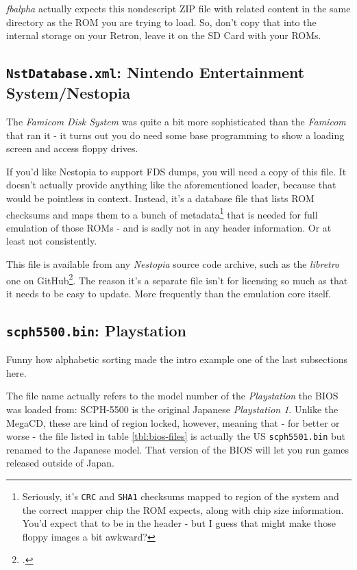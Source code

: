 \documentclass[english]{retronlabo-manual}
\begin{document}
\emph{fbalpha} actually expects this nondescript ZIP file with related content in the same directory as the ROM you are trying to load. So, don't copy that into the internal storage on your Retron, leave it on the SD Card with your ROMs.

\subsection{\texttt{NstDatabase.xml}: Nintendo Entertainment System/Nestopia}

The \emph{Famicom Disk System} was quite a bit more sophisticated than the \emph{Famicom} that ran it - it turns out you do need some base programming to show a loading screen and access floppy drives.

If you'd like Nestopia to support FDS dumps, you will need a copy of this file. It doesn't actually provide anything like the aforementioned loader, because that would be pointless in context. Instead, it's a database file that lists ROM checksums and maps them to a bunch of metadata\footnote{Seriously, it's \texttt{CRC} and \texttt{SHA1} checksums mapped to region of the system and the correct mapper chip the ROM expects, along with chip size information. You'd expect that to be in the header - but I guess that might make those floppy images a bit awkward?} that is needed for full emulation of those ROMs - and is sadly not in any header information. Or at least not consistently.

This file is available from any \emph{Nestopia} source code archive, such as the \emph{libretro} one on GitHub\footcite{ref:libretro-nestopia}. The reason it's a separate file isn't for licensing so much as that it needs to be easy to update. More frequently than the emulation core itself.

\subsection{\texttt{scph5500.bin}: Playstation}

Funny how alphabetic sorting made the intro example one of the last subsections here.

The file name actually refers to the model number of the \emph{Playstation} the BIOS was loaded from: SCPH-5500 is the original Japanese \emph{Playstation 1}. Unlike the MegaCD, these are kind of region locked, however, meaning that - for better or worse - the file listed in table \ref{tbl:bios-files} is actually the US \texttt{scph5501.bin} but renamed to the Japanese model. That version of the BIOS will let you run games released outside of Japan.
\end{document}
